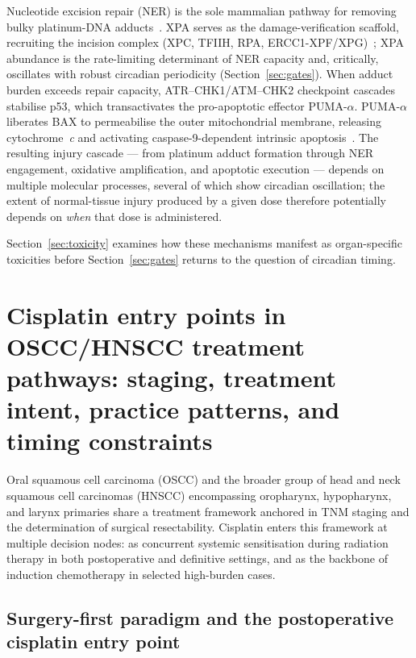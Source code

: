 \documentclass[preprint,review,12pt]{elsarticle}
\begin{document}
Nucleotide excision repair (NER) is the sole mammalian pathway for removing
bulky platinum-DNA adducts~\cite{Kang2009}. XPA serves as the
damage-verification scaffold, recruiting the incision complex (XPC, TFIIH,
RPA, ERCC1-XPF/XPG)~\cite{Kang2009, Li2011XPA}; XPA abundance is the
rate-limiting determinant of NER capacity and, critically, oscillates with
robust circadian periodicity (Section~\ref{sec:gates}).  When adduct burden
exceeds repair capacity, ATR--CHK1/ATM--CHK2 checkpoint cascades stabilise
p53, which transactivates the pro-apoptotic effector PUMA-$\alpha$.
PUMA-$\alpha$ liberates BAX to permeabilise the outer mitochondrial
membrane, releasing cytochrome~\emph{c} and activating caspase-9-dependent
intrinsic apoptosis~\cite{Pabla2008}. The resulting injury cascade --- from
platinum adduct formation through NER engagement, oxidative amplification,
and apoptotic execution --- depends on multiple molecular processes, several
of which show circadian oscillation; the extent of normal-tissue injury
produced by a given dose therefore potentially depends on \emph{when} that
dose is administered.

Section~\ref{sec:toxicity} examines how these mechanisms manifest as
organ-specific toxicities before Section~\ref{sec:gates} returns to the
question of circadian timing.


\section{Cisplatin entry points in OSCC/HNSCC treatment pathways: staging,
  treatment intent, practice patterns, and timing constraints}
\label{sec:clinical}


Oral squamous cell carcinoma (OSCC) and the broader group of head and neck
squamous cell carcinomas (HNSCC) encompassing oropharynx, hypopharynx, and
larynx primaries share a treatment framework anchored in TNM staging and the
determination of surgical resectability. Cisplatin enters this framework at
multiple decision nodes: as concurrent systemic sensitisation during
radiation therapy in both postoperative and definitive settings, and as the
backbone of induction chemotherapy in selected high-burden cases.

\subsection{Surgery-first paradigm and the postoperative cisplatin entry
  point}
\end{document}
